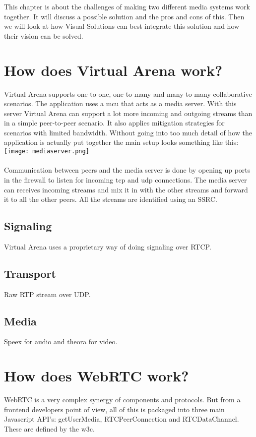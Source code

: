 
This chapter is about the challenges of making two different media systems work together. It will discuss a possible solution and the pros and cons of this. Then we will look at how Visual Solutions can best integrate this solution and how their vision can be solved.

\section{How does Virtual Arena work?}

Virtual Arena supports one-to-one, one-to-many and many-to-many collaborative scenarios. The application uses a \gls{mcu} that acts as a media server. With this server Virtual Arena can support a lot more incoming and outgoing streams than in a simple peer-to-peer scenario. It also applies mitigation strategies for scenarios with limited bandwidth. Without going into too much detail of how the application is actually put together the main setup looks something like this: 
\\
\texttt{[image: mediaserver.png]}
\\
\\
Communication between peers and the media server is done by opening up ports in the firewall to listen for incoming tcp and udp connections. The media server can receives incoming streams and mix it in with the other streams and forward it to all the other peers. All the streams are identified using an SSRC.

\subsection{Signaling}
Virtual Arena uses a proprietary way of doing signaling over RTCP.

\subsection{Transport}
Raw RTP stream over UDP.

\subsection{Media}
Speex for audio and theora for video.


\section{How does WebRTC work?}
WebRTC is a very complex synergy of components and protocols. But from a frontend developers point of view, all of this is packaged into three main Javascript API's: getUserMedia, RTCPeerConnection and RTCDataChannel. These are defined by the \gls{w3c}. 

